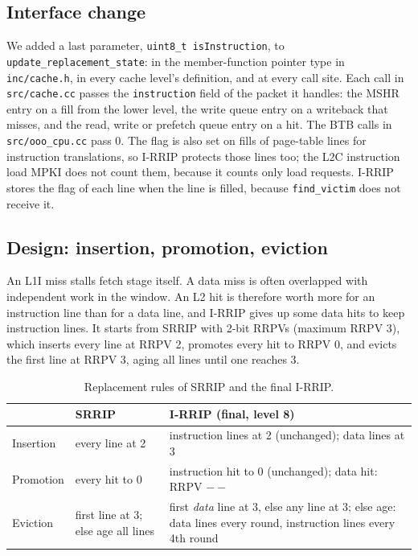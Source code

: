 
\subsection{Interface change}

{\sloppy We added a last parameter, \texttt{uint8\_t isInstruction}, to \texttt{update\_replacement\_state}: in the member-function pointer type in \texttt{inc/cache.h}, in every cache level's definition, and at every call site. Each call in \texttt{src/cache.cc} passes the \texttt{instruction} field of the packet it handles: the MSHR entry on a fill from the lower level, the write queue entry on a writeback that misses, and the read, write or prefetch queue entry on a hit. The BTB calls in \texttt{src/ooo\_cpu.cc} pass 0. The flag is also set on fills of page-table lines for instruction translations, so I-RRIP protects those lines too; the L2C instruction load MPKI does not count them, because it counts only load requests. I-RRIP stores the flag of each line when the line is filled, because \texttt{find\_victim} does not receive it.\par}

\subsection{Design: insertion, promotion, eviction}

An L1I miss stalls fetch stage itself. A data miss is often overlapped with independent work in the window. An L2 hit is therefore worth more for an instruction line than for a data line, and I-RRIP gives up some data hits to keep instruction lines. It starts from SRRIP with 2-bit RRPVs (maximum RRPV 3), which inserts every line at RRPV 2, promotes every hit to RRPV 0, and evicts the first line at RRPV 3, aging all lines until one reaches 3.

\begin{table}[H]
\centering
\small
\begin{tabular}{@{}lp{}p{}@{}}
\toprule
 & SRRIP & I-RRIP (final, level 8) \\
\midrule
Insertion & every line at 2 & instruction lines at 2 (unchanged); data lines at 3 \\
Promotion & every hit to 0 & instruction hit to 0 (unchanged); data hit: RRPV $--$ \\
Eviction  & first line at 3; else age all lines & first \emph{data} line at 3, else any line at 3; else age: data lines every round, instruction lines every 4th round \\
\bottomrule
\end{tabular}
\caption{Replacement rules of SRRIP and the final I-RRIP.}
\end{table}

